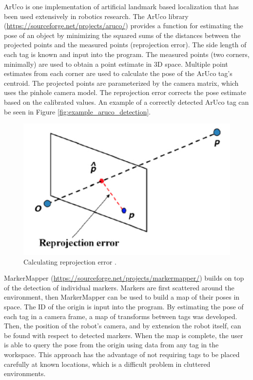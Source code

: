 \documentclass{article}
\begin{document}
      ArUco is one implementation of artificial landmark based localization that has been used extensively in robotics research. The ArUco library (\url{https://sourceforge.net/projects/aruco/}) provides a function for estimating the pose of an object by minimizing the squared sums of the distances between the projected points and the measured points (reprojection error). The side length of each tag is known and input into the program. The measured points (two corners, minimally) are used to obtain a point estimate in 3D space. Multiple point estimates from each corner are used to calculate the pose of the ArUco tag's centroid. The projected points are parameterized by the camera matrix, which uses the pinhole camera model. The reprojection error corrects the pose estimate based on the calibrated values. An example of a correctly detected ArUco tag can be seen in Figure \ref{fig:example_aruco_detection}.

      \begin{figure}[H]
        \centering
        \includegraphics[width=0.5\linewidth]{./images/reprojection_img.png}
        \caption{Calculating reprojection error \cite{richard_hartley_multiple_2003}.}
        \label{fig:reprojection_img}
      \end{figure}

      MarkerMapper (\url{https://sourceforge.net/projects/markermapper/}) builds on top of the detection of individual markers. Markers are first scattered around the environment, then MarkerMapper can be used to build a map of their poses in space. The ID of the origin is input into the program. By estimating the pose of each tag in a camera frame, a map of transforms between tags was developed. Then, the position of the robot's camera, and by extension the robot itself, can be found with respect to detected markers. When the map is complete, the user is able to query the pose from the origin using data from any tag in the workspace. This approach has the advantage of not requiring tags to be placed carefully at known locations, which is a difficult problem in cluttered environments.
\end{document}
